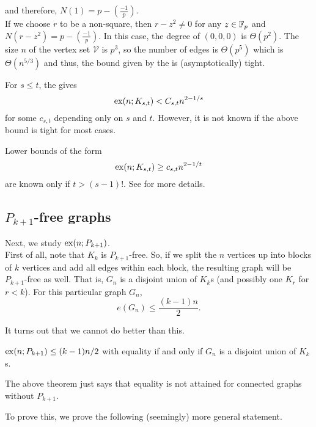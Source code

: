 			and therefore, $N(1) = p - \left(\frac{-1}{p}\right)$.\\
			If we choose $r$ to be a non-square, then $r-z^2 \neq 0$ for any $z\in\mathbb{F}_p$ and $N(r-z^2) = p - \left(\frac{-1}{p}\right)$. In this case, the degree of $(0,0,0)$ is $\Theta(p^2)$. The size $n$ of the vertex set $\mathcal{V}$ is $p^3$, so the number of edges is $\Theta(p^5)$ which is $\Theta(n^{5/3})$ and thus, the bound given by the  is (asymptotically) tight.


			For $s \le t$, the  gives
			\[ \operatorname{ex}(n;K_{s,t}) < C_{s,t} n^{2 - 1/s} \]
			for some $c_{s,t}$ depending only on $s$ and $t$. However, it is not known if the above bound is tight for most cases.

			Lower bounds of the form
			\[ \operatorname{ex}(n;K_{s,t}) \ge c_{s,t} n^{2 - 1/t} \]
			are known only if $t > (s-1)!$. See \cite{ref-1} for more details.

	\subsection{\texorpdfstring{$P_{k+1}$}{P k+1}-free graphs}

		Next, we study $\operatorname{ex}(n;P_{k+1})$.\\

		First of all, note that $K_k$ is $P_{k+1}$-free. So, if we split the $n$ vertices up into blocks of $k$ vertices and add all edges within each block, the resulting graph will be $P_{k+1}$-free as well. That is, $G_n$ is a disjoint union of $K_k$s (and possibly one $K_r$ for $r < k$). For this particular graph $G_n$,
		\[ e(G_n) \le \frac{(k-1)n}{2}. \]

		It turns out that we cannot do better than this.

		\begin{ftheo}
			\label{theo: exx n P k+1}
			$\operatorname{ex}(n;P_{k+1}) \le (k-1)n/2$ with equality if and only if $G_n$ is a disjoint union of $K_k$s.
		\end{ftheo}

		The above theorem just says that equality is not attained for connected graphs without $P_{k+1}$.

		To prove this, we prove the following (seemingly) more general statement.


